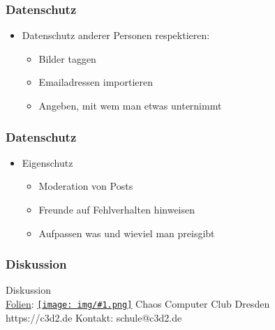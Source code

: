 \documentclass[12pt]{beamer}
\newcommand{\cc}[1]{\texttt{[image: img/\#1.png]}}
\begin{document}

\begin{frame}
  \frametitle{Datenschutz}

  \begin{itemize}
    \item Datenschutz anderer Personen respektieren:
      \begin{itemize}
        \item<2->Bilder taggen
        \item<3->Emailadressen importieren
        \item<4->Angeben, mit wem man etwas unternimmt
      \end{itemize}
  \end{itemize}
\end{frame}

\begin{frame}
  \frametitle{Datenschutz}

  \begin{itemize}
    \item Eigenschutz
      \begin{itemize}
        \item<2->Moderation von Posts
        \item<3->Freunde auf Fehlverhalten hinweisen
        \item<4->Aufpassen was und wieviel man preisgibt
      \end{itemize}
  \end{itemize}
\end{frame}

\begin{frame}
  \frametitle{Diskussion}
  \begin{center}
    {\Large Diskussion}\\
    \vspace{5mm} 
    \href{https://github.com/c3d2/cms-nsa}{Folien}: \href{https://creativecommons.org/licenses/by-sa/4.0/}{\cc{by-sa}} Chaos Computer Club Dresden \\
    \vspace{4mm}
    https://c3d2.de
    Kontakt: schule@c3d2.de
  \end{center}
\end{frame}
\end{document}
